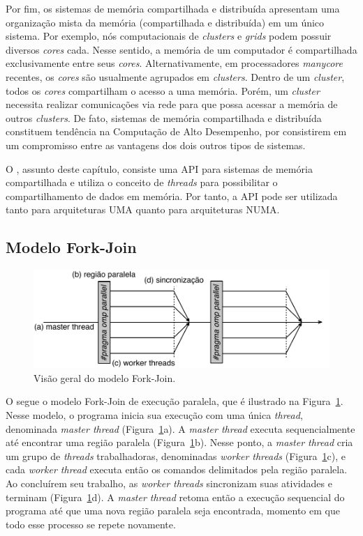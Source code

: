 \documentclass{SBCbookchapter}
\begin{document}
		Por fim, os sistemas de memória compartilhada e distribuída
		apresentam uma organização mista da memória (compartilhada e
		distribuída) em um único sistema. Por exemplo, nós
		computacionais de \textit{clusters} e \textit{grids} podem
		possuir diversos \textit{cores} cada. Nesse sentido, a memória
		de um computador é compartilhada exclusivamente entre seus
		\textit{cores}. Alternativamente, em processadores
		\textit{manycore} recentes, os \textit{cores} são usualmente
		agrupados em \textit{clusters}. Dentro de um \textit{cluster},
		todos os \textit{cores} compartilham o acesso a uma memória.
		Porém, um \textit{cluster} necessita realizar comunicações via
		rede para que possa acessar a memória de outros
		\textit{clusters}. De fato, sistemas de memória compartilhada e
		distribuída constituem tendência na Computação de Alto
		Desempenho, por consistirem em um compromisso entre as vantagens
		dos dois outros tipos de sistemas.

		O \openmp, assunto deste capítulo, consiste uma API para
		sistemas de memória compartilhada e utiliza o conceito de
		\textit{threads} para possibilitar o compartilhamento de dados
		em memória. Por tanto, a API pode ser utilizada tanto para
		arquiteturas UMA quanto para arquiteturas NUMA.
		
	\subsection{Modelo Fork-Join}

		\begin{figure}[b]
			\centering
			\includegraphics[width=0.8\linewidth]{img/fork-join}
			\caption{Visão geral do modelo Fork-Join.}\label{fig:fork-join}
		\end{figure}

		O \openmp segue o modelo Fork-Join de execução paralela, que é
		ilustrado na Figura~\ref{fig:fork-join}. Nesse modelo, o
		programa inicia sua execução com uma única \textit{thread},
		denominada \textit{master thread} (Figura~\ref{fig:fork-join}a).
		A \textit{master thread} executa sequencialmente até encontrar
		uma região paralela (Figura~\ref{fig:fork-join}b). Nesse ponto,
		a \textit{master thread} cria um grupo de \textit{threads}
		trabalhadoras, denominadas \textit{worker threads}
		(Figura~\ref{fig:fork-join}c), e cada \textit{worker thread}
		executa então os comandos delimitados pela região paralela. Ao
		concluírem seu trabalho, as \textit{worker threads} sincronizam
		suas atividades e terminam (Figura~\ref{fig:fork-join}d). A
		\textit{master thread} retoma então a execução sequencial do
		programa até que uma nova região paralela seja encontrada,
		momento em que todo esse processo se repete novamente.
		
\end{document}
